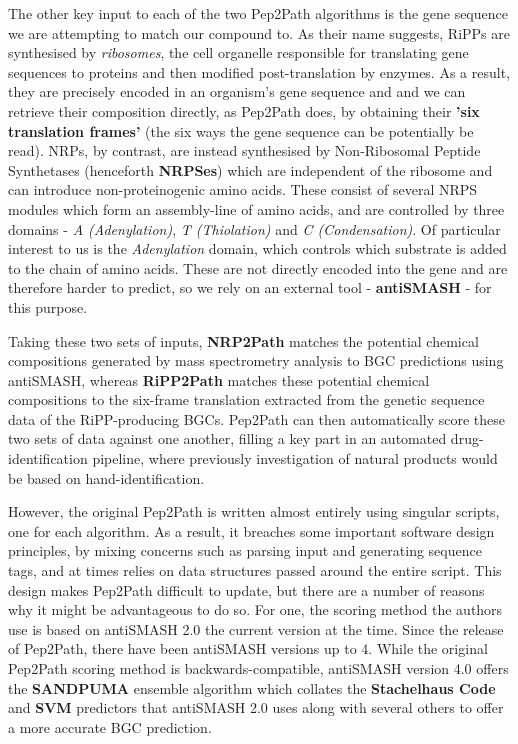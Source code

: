\documentclass{l4proj}
\newcommand{\cit}[1]{\citep{#1}}
\begin{document}
The other key input to each of the two Pep2Path algorithms is the gene sequence we are attempting to match our compound to. As their name suggests, RiPPs are synthesised by \textit{ribosomes}, the cell organelle responsible for translating gene sequences to proteins and then modified post-translation by enzymes. As a result, they are precisely encoded in an organism's gene sequence and and we can retrieve their composition directly, as Pep2Path does, by obtaining their \textbf{'six translation frames'} (the six ways the gene sequence can be potentially be read). NRPs, by contrast, are instead synthesised by Non-Ribosomal Peptide Synthetases (henceforth \textbf{NRPSes}) which are independent of the ribosome and can introduce non-proteinogenic amino acids. These consist of several NRPS modules which form an assembly-line of amino acids, and are controlled by three domains - \textit{A (Adenylation)}, \textit{T (Thiolation)} and \textit{C (Condensation)}. Of particular interest to us is the \textit{Adenylation} domain, which controls which substrate is added to the chain of amino acids. These are not directly encoded into the gene and are therefore harder to predict, so we rely on an external tool - \textbf{antiSMASH} \cit{as4} - for this purpose.

Taking these two sets of inputs, \textbf{NRP2Path} matches the potential chemical compositions generated by mass spectrometry analysis to BGC predictions using antiSMASH, whereas \textbf{RiPP2Path} matches these potential chemical compositions to the six-frame translation extracted from the genetic sequence data of the RiPP-producing BGCs. Pep2Path can then automatically score these two sets of data against one another, filling a key part in an automated drug-identification pipeline, where previously investigation of natural products would be based on hand-identification.

However, the original Pep2Path is written almost entirely using singular scripts, one for each algorithm. As a result, it breaches some important software design principles, by mixing concerns such as parsing input and generating sequence tags, and at times relies on data structures passed around the entire script. This design makes Pep2Path difficult to update, but there are a number of reasons why it might be advantageous to do so. For one, the scoring method the authors use is based on antiSMASH 2.0 \cit{as2} the current version at the time. Since the release of Pep2Path, there have been antiSMASH versions up to 4. \cit{as4} While the original Pep2Path scoring method is backwards-compatible, antiSMASH version 4.0 offers the \textbf{SANDPUMA} ensemble algorithm \cit{sandpuma} which collates the \textbf{Stachelhaus Code} and \textbf{SVM} predictors that antiSMASH 2.0 uses along with several others to offer a more accurate BGC prediction.
\end{document}
